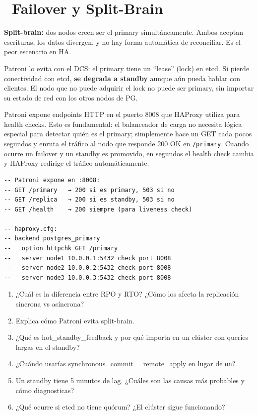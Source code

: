 \section[Failover y Split-Brain]{~Failover y Split-Brain}

\begin{warningbox}
\textbf{Split-brain:} dos nodos creen ser el primary simultáneamente. Ambos aceptan escrituras, los datos divergen, y no hay forma automática de reconciliar. Es el peor escenario en HA.

Patroni lo evita con el DCS: el primary tiene un ``lease'' (lock) en etcd. Si pierde conectividad con etcd, \textbf{se degrada a standby} aunque aún pueda hablar con clientes.
El nodo que no puede adquirir el lock no puede ser primary, sin importar su estado de red con los otros nodos de PG.
\end{warningbox}

Patroni expone endpoints HTTP en el puerto 8008 que HAProxy utiliza para health checks.
Esto es fundamental: el balanceador de carga no necesita lógica especial para detectar quién es el primary; simplemente hace un GET cada pocos segundos y enruta el tráfico al nodo que responde 200 OK en \texttt{/primary}.
Cuando ocurre un failover y un standby es promovido, en segundos el health check cambia y HAProxy redirige el tráfico automáticamente.

\begin{lstlisting}[caption={Health endpoint de Patroni para HAProxy}]
-- Patroni expone en :8008:
-- GET /primary   → 200 si es primary, 503 si no
-- GET /replica   → 200 si es standby, 503 si no
-- GET /health    → 200 siempre (para liveness check)

-- haproxy.cfg:
-- backend postgres_primary
--   option httpchk GET /primary
--   server node1 10.0.0.1:5432 check port 8008
--   server node2 10.0.0.2:5432 check port 8008
--   server node3 10.0.0.3:5432 check port 8008
\end{lstlisting}

\begin{entrevistabox}
\begin{enumerate}
  \item ¿Cuál es la diferencia entre RPO y RTO? ¿Cómo los afecta la replicación síncrona vs asíncrona?
  \item Explica cómo Patroni evita split-brain.
  \item ¿Qué es hot\_standby\_feedback y por qué importa en un clúster con queries largas en el standby?
  \item ¿Cuándo usarías synchronous\_commit = remote\_apply en lugar de \texttt{on}?
  \item Un standby tiene 5 minutos de lag. ¿Cuáles son las causas más probables y cómo diagnosticas?
  \item ¿Qué ocurre si etcd no tiene quórum? ¿El clúster sigue funcionando?
\end{enumerate}
\end{entrevistabox}
